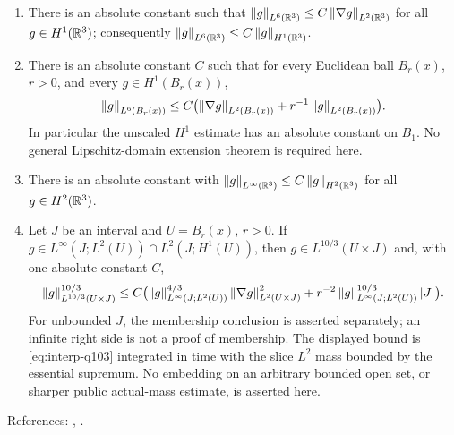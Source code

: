 \documentclass[11pt,reqno]{amsart}
\begin{document}
\begin{externalinput}\label{ext:sobolev-ball}\leavevmode
\begin{enumerate}
\item[(i)] There is an absolute constant such that
  $\left\lVert g \right\rVert_{L^{6}(\mathbb{R}^{3})}\le C\left\lVert \nabla g \right\rVert_{L^{2}(\mathbb{R}^{3})}$ for all
  $g\in H^{1}(\mathbb{R}^{3})$; consequently
  $\left\lVert g \right\rVert_{L^{6}(\mathbb{R}^{3})}\le C\left\lVert g \right\rVert_{H^{1}(\mathbb{R}^{3})}$.
\item[(ii)] There is an absolute constant $C$ such that for every Euclidean
  ball $B_r(x)$, $r>0$, and every $g\in H^1(B_r(x))$,
  \[
    \left\lVert g \right\rVert_{L^6(B_r(x))}
      \le C\bigl(\left\lVert \nabla g \right\rVert_{L^2(B_r(x))}
                       +r^{-1}\left\lVert g \right\rVert_{L^2(B_r(x))}\bigr).
  \]
  In particular the unscaled $H^1$ estimate has an absolute constant on $B_1$.
  No general Lipschitz-domain extension theorem is required here.
\item[(iii)] There is an absolute constant with
  $\left\lVert g \right\rVert_{L^{\infty}(\mathbb{R}^{3})}\le C\left\lVert g \right\rVert_{H^{2}(\mathbb{R}^{3})}$ for all
  $g\in H^{2}(\mathbb{R}^{3})$.
\item[(iv)] Let $J$ be an interval and $U=B_r(x)$, $r>0$. If
  $g\in L^\infty(J;L^2(U))\cap L^2(J;H^1(U))$, then
  $g\in L^{10/3}(U\times J)$ and, with one absolute constant $C$,
  \[
  \left\lVert g \right\rVert_{L^{10/3}(U\times J)}^{10/3}
   \le C\bigl(\left\lVert g \right\rVert_{L^\infty(J;L^2(U))}^{4/3}
                  \left\lVert \nabla g \right\rVert_{L^2(U\times J)}^2
       +r^{-2}\left\lVert g \right\rVert_{L^\infty(J;L^2(U))}^{10/3}|J|\bigr).
  \]
  For unbounded $J$, the membership conclusion is asserted separately;
  an infinite right side is not a proof of membership. The displayed
  bound is \eqref{eq:interp-q103} integrated in time with the slice
  $L^2$ mass bounded by the essential supremum. No embedding on an
  arbitrary bounded open set, or sharper public actual-mass estimate,
  is asserted here.
\end{enumerate}
References: \cite[Ch.~7]{GilbargTrudinger2001}, \cite[Ch.~V]{Stein1970}.
\end{externalinput}
\end{document}
